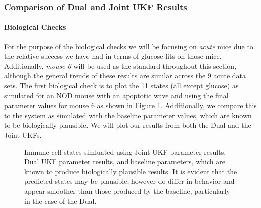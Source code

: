\subsubsection{Comparison of Dual and Joint UKF Results}

\paragraph{Biological Checks} \label{section:T1D_Biological_Checks}
For the purpose of the biological checks we will be focusing on \emph{acute} mice due to the relative success we have had in terms of glucose fits on those mice. Additionally, \emph{mouse 6} will be used as the standard throughout this section, although the general trends of these results are similar across the 9 acute data sets. The first biological check is to plot the 11 states (all except glucose) as simulated for an NOD mouse with an apoptotic wave and using the final parameter values for mouse 6 as shown in Figure \ref{fig:T1D_StatesWithWave}. Additionally, we compare this to the system as simulated with the baseline parameter values, which are known to be biologically plausible. We will plot our results from both the Dual and the Joint UKFs. \\

\begin{figure}[H]
    \centering
    \hfill
    \hfill
    \caption{Immune cell states simluated using Joint UKF parameter results, Dual UKF parameter results, and baseline parameters, which are known to produce biologically plausible results. It is evident that the predicted states may be plausible, however do differ in behavior and appear smoother than those produced by the baseline, particularly in the case of the Dual.}
    \label{fig:T1D_StatesWithWave}

\end{figure}



